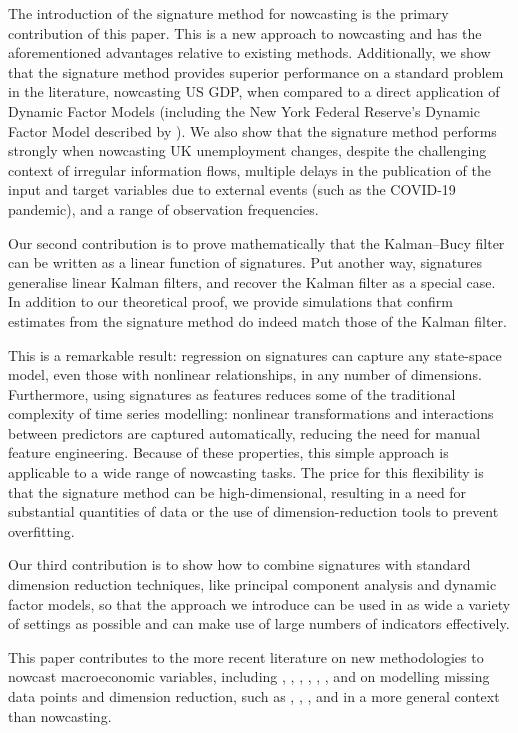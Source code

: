\documentclass[a4paper, 12pt]{article}
\theoremstyle{remark}
\begin{document}
The introduction of the signature method for nowcasting is the primary contribution of this paper. This is a new approach to nowcasting and has the aforementioned advantages relative to existing methods. Additionally, we show that the signature method provides superior performance on a standard problem in the literature, nowcasting US GDP, when compared to a direct application of Dynamic Factor Models (including the New York Federal Reserve's Dynamic Factor Model described by \citet{bok2018macroeconomic}). We also show that the signature method performs strongly when nowcasting UK unemployment changes, despite the challenging context of irregular information flows, multiple delays in the publication of the input and target variables due to external events (such as the COVID-19 pandemic), and a range of observation frequencies.

Our second contribution is to prove mathematically that the Kalman--Bucy filter can be written as a linear function of signatures. Put another way, signatures generalise linear Kalman filters, and recover the Kalman filter as a special case. In addition to our theoretical proof, we provide simulations that confirm estimates from the signature method do indeed match those of the Kalman filter.

This is a remarkable result: regression on signatures can capture any state-space model, even those with nonlinear relationships, in any number of dimensions. Furthermore, using signatures as features reduces some of the traditional complexity of time series modelling: nonlinear transformations and interactions between predictors are captured automatically, reducing the need for manual feature engineering. Because of these properties, this simple approach is applicable to a wide range of nowcasting tasks. 
The price for this flexibility is that the signature method can be high-dimensional, resulting in a need for substantial quantities of data or the use of dimension-reduction tools to prevent overfitting.

Our third contribution is to show how to combine signatures with standard dimension reduction techniques, like principal component analysis and dynamic factor models, so that the approach we introduce can be used in as wide a variety of settings as possible and can make use of large numbers of indicators effectively.

This paper contributes to the more recent literature on new methodologies to nowcast macroeconomic variables, including \citet{jokubaitis2021sparse}, \citet{proietti2021nowcasting}, \citet{soybilgen2021nowcasting}, \citet{aastveit2018combined}, \citet{ankargren2021simulation}, \citet{babii2022machine}, and on modelling missing data points and dimension reduction, such as \citet{pellegrino2020selecting}, \citet{smeekes2021automated}, \citet{buccheri2021score}, and \citet{chan2023high} in a more general context than nowcasting.
\end{document}
